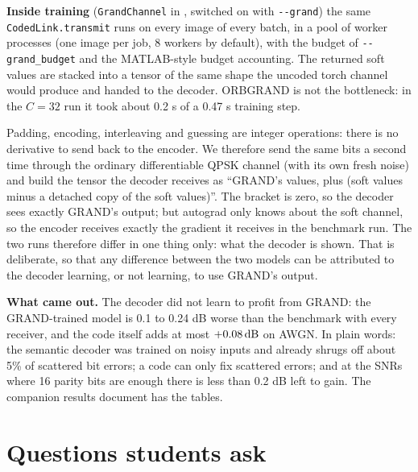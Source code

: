 \documentclass{article}
\begin{document}
\textbf{Inside training} (\texttt{GrandChannel} in , switched on with
\texttt{-{}-grand}) the same \texttt{CodedLink.transmit} runs on every image of every batch, in a pool of
worker processes (one image per job, 8 workers by default), with the budget of
\texttt{-{}-grand\_budget} and the MATLAB-style budget accounting. The returned soft values are stacked
into a tensor of the same shape the uncoded torch channel would produce and handed to the decoder.
ORBGRAND is not the bottleneck: in the $C=32$ run it took about 0.2 s of a 0.47 s training step.

\begin{conceptbox}[title={The gradient trick, in words}]
Padding, encoding, interleaving and guessing are integer operations: there is no derivative to send back
to the encoder. We therefore send the same bits a second time through the ordinary differentiable QPSK
channel (with its own fresh noise) and build the tensor the decoder receives as ``GRAND's values, plus
(soft values minus a detached copy of the soft values)''. The bracket is zero, so the decoder sees exactly
GRAND's output; but autograd only knows about the soft channel, so the encoder receives exactly the
gradient it receives in the benchmark run. The two runs therefore differ in one thing only: what the
decoder is shown. That is deliberate, so that any difference between the two models can be attributed to
the decoder learning, or not learning, to use GRAND's output.
\end{conceptbox}

\textbf{What came out.} The decoder did not learn to profit from GRAND: the GRAND-trained model is 0.1
to 0.24 dB worse than the benchmark with every receiver, and the code itself adds at most $+0.08\,\mathrm{dB}$ on
AWGN. In plain words: the semantic decoder was trained on noisy inputs and already shrugs off about 5\%
of scattered bit errors; a code can only fix scattered errors; and at the SNRs where 16 parity bits are
enough there is less than 0.2 dB left to gain. The companion results document has the tables.

\section{Questions students ask}
\label{sec:faq}
\end{document}
